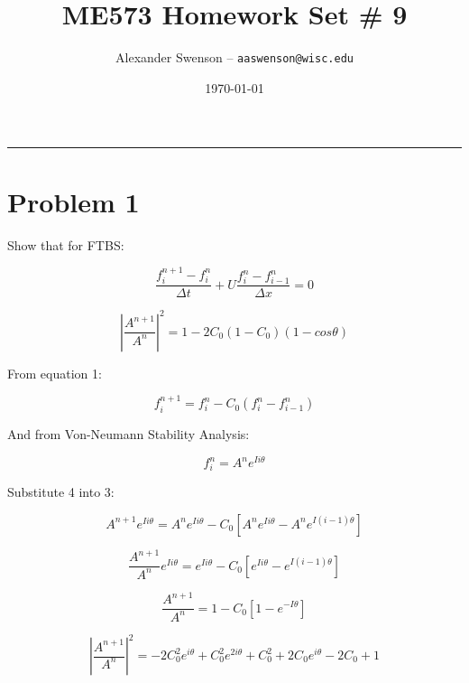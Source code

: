 \documentclass[12pt]{article}
\title{ME573 Homework Set \# 9}
\author{Alexander Swenson -- \texttt{aaswenson@wisc.edu}}
\date{\today}
\begin{document}
	
	\maketitle
	
	\vspace{-0.3in}
	\noindent
	\rule{\linewidth}{0.4pt}
	
	\noindent
	

	
	
	\section{Problem 1}
	
	Show that for FTBS:
	
	\begin{equation}
	\frac{f_i^{n+1}-f_i^n}{\Delta t} + U \frac{f_i^n - f_{i-1}^n}{\Delta x} = 0
	\end{equation}
	
	\begin{equation}
	|\frac{A^{n+1}}{A^n}| ^2 = 1 - 2C_0(1-C_0)(1-cos\theta)
	\end{equation}
	
	From equation 1:
	
	\begin{equation}
	f_i^{n+1} = f_i^n - C_0(f_i^n - f_{i-1}^n)
	\end{equation}
	
	And from Von-Neumann Stability Analysis:
	
	\begin{equation}
		f_i^n = A^n e^{Ii\theta}
	\end{equation}
	
	Substitute 4 into 3:
	
	\begin{equation}
		A^{n+1}e^{Ii\theta} = A^ne^{Ii\theta} - C_0[A^ne^{Ii\theta} - A^ne^{I(i-1)\theta}]
	\end{equation}
	
	\begin{equation}
		\frac{A^{n+1}}{A^n}e^{Ii\theta} = e^{Ii\theta} - C_0[e^{Ii\theta} - e^{I(i-1)\theta}]
	\end{equation}
	
	\begin{equation}
		\frac{A^{n+1}}{A^n} = 1 - C_0[1 - e^{-I\theta}]	
	\end{equation}
	
	\begin{equation}
		|\frac{A^{n+1}}{A^n}|^2 = -2C_0^2e^{i\theta} + C_0^2e^{2i\theta} + C_0^2 + 2C_0e^{i\theta}-2C_0 + 1
	\end{equation}
		
\end{document}
